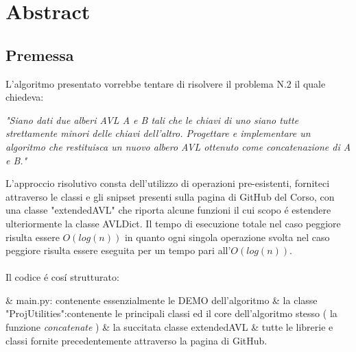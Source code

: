 \chapter{Abstract}
\section{Premessa}
L'algoritmo presentato vorrebbe tentare di risolvere il problema N.2 il quale chiedeva:\\ 
\begin{center}
	\emph{"Siano   dati   due   alberi   AVL   A   e   B   tali   che   le   chiavi   di   uno   siano   tutte strettamente   minori   delle   chiavi   dell'altro.   Progettare   e   implementare   un algoritmo   che   restituisca   un   nuovo   albero   AVL   ottenuto   come concatenazione   di   A   e   B."}\\
\end{center}
L'approccio risolutivo consta dell'utilizzo di operazioni pre-esistenti, forniteci attraverso le classi e gli snipset presenti sulla pagina di GitHub del Corso, con una classe "extendedAVL" che riporta alcune funzioni il cui scopo \'e estendere ulteriormente la classe AVLDict. Il tempo di esecuzione totale nel caso peggiore risulta essere $O(log(n))$ in quanto ogni singola operazione svolta nel caso peggiore risulta essere eseguita per un tempo pari all'$O(log(n))$.
\\ \\
Il codice \'e cos\'i strutturato:
\begin{easylist}[itemize]
	& main.py: contenente essenzialmente le DEMO dell'algoritmo
	& la classe "ProjUtilities":contenente le principali classi ed il core dell'algoritmo stesso ( la funzione \emph{concatenate} )
	& la succitata classe extendedAVL 
	& tutte le librerie e classi fornite precedentemente attraverso la pagina di GitHub.
\end{easylist} 

